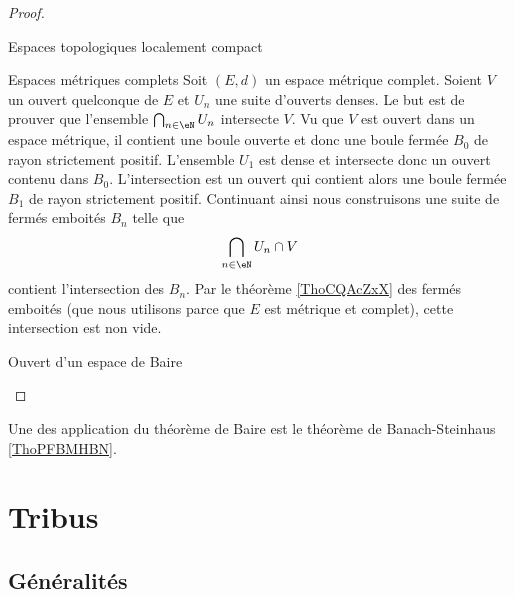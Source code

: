\begin{proof}
    \begin{subproof}
    \item[Espaces topologiques localement compact]
        \item[Espaces métriques complets]
            Soit \( (E,d)\) un espace métrique complet. Soient \( V\) un ouvert quelconque de \( E\) et \( U_n\) une suite d'ouverts denses. Le but est de prouver que l'ensemble \( \bigcap_{n\in \eN}U_n\) intersecte \( V\). Vu que \( V\) est ouvert dans un espace métrique, il contient une boule ouverte et donc une boule fermée \( B_0\) de rayon strictement positif. L'ensemble \( U_1\) est dense et intersecte donc un ouvert contenu dans \( B_0\). L'intersection est un ouvert qui contient alors une boule fermée \( B_1\) de rayon strictement positif. Continuant ainsi nous construisons une suite de fermés emboités \( B_n\) telle que
            \begin{equation}
                \bigcap_{n\in \eN}U_n\cap V
            \end{equation}
            contient l'intersection des \( B_n\). Par le théorème \ref{ThoCQAcZxX} des fermés emboités (que nous utilisons parce que \( E\) est métrique et complet), cette intersection est non vide.
        \item[Ouvert d'un espace de Baire]
    \end{subproof}
\end{proof}

Une des application du théorème de Baire est le théorème de Banach-Steinhaus \ref{ThoPFBMHBN}.

\section{Tribus}

\subsection{Généralités}

